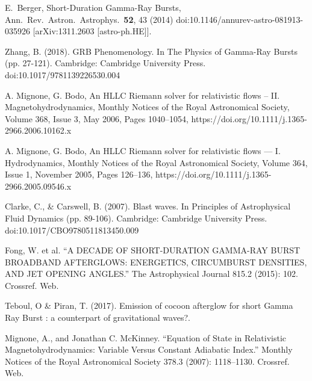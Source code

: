 \documentclass[12pt,a4paper]{book}
\begin{document}
\begin{thebibliography}{20}


  E.~Berger,
  Short-Duration Gamma-Ray Bursts,
  Ann.\ Rev.\ Astron.\ Astrophys.\  {\bf 52}, 43 (2014)
  doi:10.1146/annurev-astro-081913-035926
  [arXiv:1311.2603 [astro-ph.HE]].
 


Zhang, B. (2018). GRB Phenomenology. In The Physics of Gamma-Ray Bursts (pp. 27-121). Cambridge: Cambridge University Press. doi:10.1017/9781139226530.004

A. Mignone, G. Bodo, An HLLC Riemann solver for relativistic flows – II. Magnetohydrodynamics, Monthly Notices of the Royal Astronomical Society, Volume 368, Issue 3, May 2006, Pages 1040–1054, https://doi.org/10.1111/j.1365-2966.2006.10162.x

A. Mignone, G. Bodo, An HLLC Riemann solver for relativistic flows — I. Hydrodynamics, Monthly Notices of the Royal Astronomical Society, Volume 364, Issue 1, November 2005, Pages 126–136, https://doi.org/10.1111/j.1365-2966.2005.09546.x

Clarke, C., \& Carswell, B. (2007). Blast waves. In Principles of Astrophysical Fluid Dynamics (pp. 89-106). Cambridge: Cambridge University Press. doi:10.1017/CBO9780511813450.009

Fong, W. et al. “A DECADE OF SHORT-DURATION GAMMA-RAY BURST BROADBAND AFTERGLOWS: ENERGETICS, CIRCUMBURST DENSITIES, AND JET OPENING ANGLES.” The Astrophysical Journal 815.2 (2015): 102. Crossref. Web.

Teboul, O \& Piran, T. (2017). Emission of cocoon afterglow for short Gamma Ray Burst : a counterpart of gravitational waves?. 

Mignone, A., and Jonathan C. McKinney. “Equation of State in Relativistic Magnetohydrodynamics: Variable Versus Constant Adiabatic Index.” Monthly Notices of the Royal Astronomical Society 378.3 (2007): 1118–1130. Crossref. Web.


\end{thebibliography}
\end{document}
